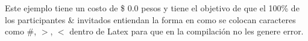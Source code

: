 \documentclass[12pt, letterpaper]{article}
\begin{document}
Este ejemplo tiene un costo de \$ 0.0 pesos y tiene el objetivo de que el 100\% de los participantes \& invitados entiendan la forma en como se colocan caracteres como \#, $>$, $<$ dentro de Latex para que en la compilación no les genere error.  
\end{document}
